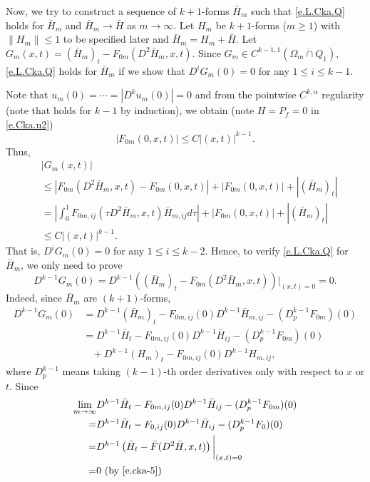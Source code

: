 \documentclass[preprint,12pt]{elsarticle}
\theoremstyle{definition}
\theoremstyle{remark}
\numberwithin{equation}{section}
\begin{document}
Now, we try to construct a sequence of $k+1$-forms $\bar{H}_m$ such that \cref{e.L.Cka.Q} holds for $\bar{H}_m$ and $\bar{H}_m\rightarrow \bar{H}$ as $m\rightarrow \infty$. Let $H_m$ be $k+1$-forms ($m\geq 1$) with $\|H_m\|\leq 1$ to be specified later and $\bar{H}_m=H_m+\bar{H}$.  Let $G_m(x,t)=(\bar{H}_m)_t-F_{0m}(D^2\bar{H}_m,x,t)$. Since $G_m\in C^{k-1,1}(\overline{\Omega_m\cap{Q}_{1}})$, \cref{e.L.Cka.Q} holds for $\bar{H}_m$ if we show that $D^iG_m(0)=0$ for any $1\leq i\leq k-1$.

Note that $u_m(0)=\cdots=|D^{k}u_m(0)|=0$ and from the pointwise $C^{k,\alpha}$ regularity (note that  holds for $k-1$ by induction), we obtain (note $H=P_f=0$ in \cref{e.Cka.u2})
\begin{equation*}
|F_{0m}(0,x,t)|\leq C|(x,t)|^{k-1}.
\end{equation*}
Thus,
\begin{equation*}
  \begin{aligned}
&|G_m(x,t)|\\
&\leq |F_{0m}(D^2\bar{H}_m,x,t)-F_{0m}(0,x,t)|
    +|F_{0m}(0,x,t)|+|(\bar{H}_m)_t|\\
&=\left|\int_{0}^{1} F_{0m,ij}(\tau D^2\bar{H}_m,x,t)\bar{H}_{m,ij}d\tau \right|
    +|F_{0m}(0,x,t)|+|(\bar{H}_m)_t|\\
&\leq C|(x,t)|^{k-1}.
  \end{aligned}
\end{equation*}
That is, $D^iG_m(0)=0$ for any $1\leq i\leq k-2$. Hence, to verify \cref{e.L.Cka.Q} for $\bar{H}_m$, we only need to prove
\begin{equation*}
D^{k-1}G_m(0)=D^{k-1}\left((\bar{H}_m)_t- F_{0m}(D^2\bar{H}_m,x,t)\right)\bigg|_{(x,t)=0}=0.
\end{equation*}
Indeed, since $\bar{H}_{m}$ are $(k+1)$-forms,
\begin{equation*}
  \begin{aligned}
D^{k-1}G_m(0)&=D^{k-1}(\bar{H}_m)_t-F_{0m,ij}(0)D^{k-1}\bar{H}_{m,ij}-(D^{k-1}_{p}F_{0m})(0)\\
&=D^{k-1}\bar{H}_t-F_{0m,ij}(0)D^{k-1}\bar{H}_{ij}-(D^{k-1}_{p}F_{0m})(0)\\
&~~~~+D^{k-1}(H_m)_t-F_{0m,ij}(0)D^{k-1}H_{m,ij},
  \end{aligned}
\end{equation*}
where $D^{k-1}_{p}$ means taking $(k-1)$-th order derivatives only with respect
to $x$ or $t$. Since
\begin{equation*}
  \begin{aligned}
\lim_{m\rightarrow \infty} & D^{k-1}\bar{H}_t-F_{0m,ij}(0)D^{k-1}\bar{H}_{ij}-(D^{k-1}_{p}F_{0m})(0)\\ =&D^{k-1}\bar{H}_t-F_{0,ij}(0)D^{k-1}\bar{H}_{ij}-(D^{k-1}_{p}F_{0})(0)\\
=&D^{k-1}\left(\bar{H}_t-\bar F(D^2\bar{H},x,t)\right)\bigg |_{(x,t)=0}\\
=&0~(\mbox{by}~ \cref{e.cka-5})
  \end{aligned}
\end{equation*}
\end{document}
